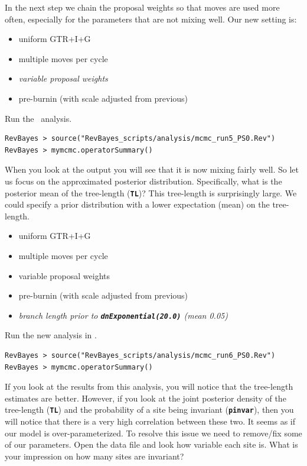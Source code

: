 \documentclass[11pt]{article}
\newcommand{\cl}[1]{{\texttt{\textbf{#1}}}}
\begin{document}
In the next step we chain the proposal weights so that moves are used more often, especially for the parameters that are not mixing well.
Our new setting is:
\begin{itemize}
\item{uniform GTR+I+G}
\item{multiple moves per cycle}
\item{\it variable proposal weights}
\item{pre-burnin (with scale adjusted from previous)}
\end{itemize}
Run the \RevBayes~analysis.
{\tt \begin{snugshade*}
\begin{lstlisting}
RevBayes > source("RevBayes_scripts/analysis/mcmc_run5_PS0.Rev")
RevBayes > mymcmc.operatorSummary()
\end{lstlisting}
\end{snugshade*}}
When you look at the output you will see that it is now mixing fairly well.
So let us focus on the approximated posterior distribution.
Specifically, what is the posterior mean of the tree-length (\cl{TL})?
This tree-length is surprisingly large. 
We could specify a prior distribution with a lower expectation (mean) on the tree-length.
\begin{itemize}
\item{uniform GTR+I+G}
\item{multiple moves per cycle}
\item{variable proposal weights}
\item{pre-burnin (with scale adjusted from previous)}
\item{\it branch length prior to \cl{dnExponential(20.0)} (mean 0.05)}
\end{itemize}
Run the new analysis in \RevBayes.
{\tt \begin{snugshade*}
\begin{lstlisting}
RevBayes > source("RevBayes_scripts/analysis/mcmc_run6_PS0.Rev")
RevBayes > mymcmc.operatorSummary()
\end{lstlisting}
\end{snugshade*}}
If you look at the results from this analysis, you will notice that the tree-length estimates are better.
However, if you look at the joint posterior density of the tree-length (\cl{TL}) and the probability of a site being invariant (\cl{pinvar}), then you will notice that there is a very high correlation between these two.
It seems as if our model is over-parameterized.
To resolve this issue we need to remove/fix some of our parameters.
Open the data file and look how variable each site is. What is your impression on how many sites are invariant?
\end{document}
